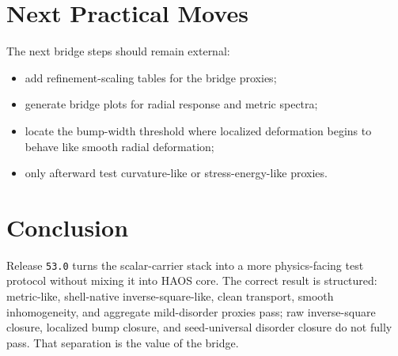 \documentclass[11pt]{article}
\begin{document}
\section{Next Practical Moves}

The next bridge steps should remain external:
\begin{itemize}
\item add refinement-scaling tables for the bridge proxies;
\item generate bridge plots for radial response and metric spectra;
\item locate the bump-width threshold where localized deformation begins to behave like smooth radial deformation;
\item only afterward test curvature-like or stress-energy-like proxies.
\end{itemize}

\section{Conclusion}

Release \texttt{53.0} turns the scalar-carrier stack into a more physics-facing test protocol without mixing it into HAOS core. The correct result is structured: metric-like, shell-native inverse-square-like, clean transport, smooth inhomogeneity, and aggregate mild-disorder proxies pass; raw inverse-square closure, localized bump closure, and seed-universal disorder closure do not fully pass. That separation is the value of the bridge.
\end{document}
